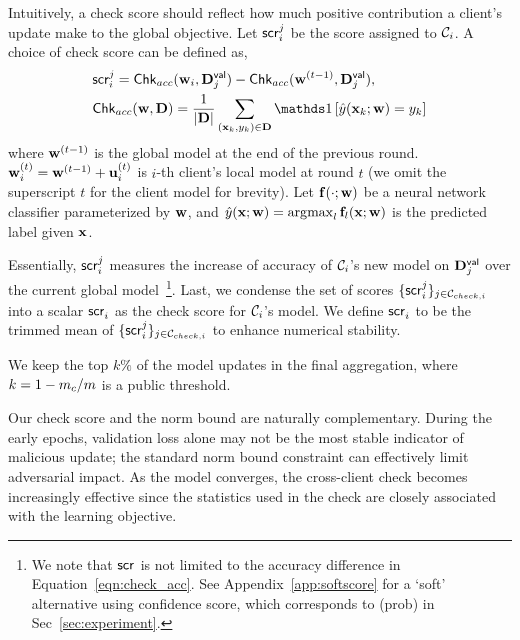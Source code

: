  Intuitively, a check score should reflect how much positive contribution a client's update make to the global objective. Let $\score{i}{j}$ be the score assigned to $\calC_i$.
A choice of check score can be defined as,
\begin{align}
\label{eqn:check_acc}
    &\score{i}{j} = \msf{Chk}_{acc}(\bfw_i, \bfD^{\msf{val}}_j) - \msf{Chk}_{acc}(\bfw^{(t - 1)}, \bfD^{\msf{val}}_j), \\ \nonumber
    &\msf{Chk}_{acc}(\bfw, \bfD) = \frac{1}{|\bfD|} \sum_{(\bfx_k, y_k) \in \bfD} \indicator{\hat{y}(\bfx_k; \bfw) = y_k}
\end{align}
where $\bfw^{(t - 1)}$ is the global model at the end of the previous round.
$\bfw^{(t)}_i = \bfw^{(t - 1)} + \bfu^{(t)}_i$ is $i$-th client's local model at round $t$ (we omit the superscript $t$ for the client model for brevity).
Let $\bff(\cdot; \bfw)$ be a neural network classifier parameterized by $\bfw$, and 
$\hat{y}(\bfx; \bfw) = \argmax_l \bff_l (\bfx; \bfw)$ is the predicted label given $\bfx$.

Essentially, $\score{i}{j}$ measures the increase of accuracy of $\calC_i$'s new model on $\bfD^{\msf{val}}_j$ over the current global model~\footnote{We note that $\score{}{}$ is not limited to the accuracy difference in Equation~\ref{eqn:check_acc}. See Appendix~\ref{app:softscore} for a `soft' alternative using confidence score, which corresponds to \ours(prob) in Sec~\ref{sec:experiment}.}.
Last, we condense the set of scores $\{\score{i}{j} \}_{j \in \calC_{check, i}}$ into a scalar $\score{i}{}$ as the check score for $\calC_i$'s model. We define $\score{i}{}$ to be the trimmed mean of $\{\score{i}{j} \}_{j \in \calC_{check, i}}$ to enhance numerical stability. 






We keep the top $k\%$ of the model updates in the final aggregation, where $k = 1-\cor/m$ is a public threshold.

 Our check score and the norm bound are naturally complementary. During the early epochs, validation loss alone may not be the most stable indicator of malicious update; the standard norm bound constraint can effectively limit adversarial impact. As the model converges, the cross-client check becomes increasingly effective since the statistics used in the check are closely associated with the learning objective. 







